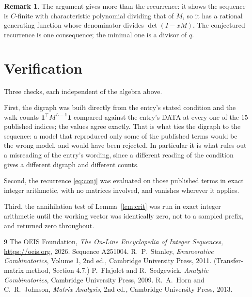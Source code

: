 \documentclass[11pt,a4paper]{article}
\theoremstyle{plain}
\theoremstyle{definition}
\newtheorem{remark}[theorem]{Remark}
\begin{document}
\begin{remark}
The argument gives more than the recurrence: it shows the sequence is $C$-finite with
characteristic polynomial dividing that of $M$, so it has a rational generating function
whose denominator divides $\det(I-xM)$. The conjectured recurrence is one consequence; the
minimal one is a divisor of $q$.
\end{remark}

\section{Verification}

Three checks, each independent of the algebra above.

First, the digraph was built directly from the entry's stated condition and the walk counts
$\mathbf{1}^{\!\top}M^{L-1}\mathbf{1}$ compared against the entry's DATA at
every one of the $15$ published indices; the values agree exactly. That is what ties
the digraph to the sequence: a model that reproduced only some of the published terms would
be the wrong model, and would have been rejected. In particular it is what rules out a
misreading of the entry's wording, since a different reading of the condition gives a
different digraph and different counts.

Second, the recurrence \eqref{eq:conj} was evaluated on those published terms in exact
integer arithmetic, with no matrices involved, and vanishes wherever it applies.

Third, the annihilation test of Lemma~\ref{lem:crit} was run in exact integer arithmetic
until the working vector was identically zero, not to a sampled prefix, and returned zero
throughout.

\begin{thebibliography}{9}
 The OEIS Foundation, \emph{The On-Line Encyclopedia of Integer
Sequences}, \url{https://oeis.org}, 2026. Sequence A251004.
 R.~P.~Stanley, \emph{Enumerative Combinatorics}, Volume 1, 2nd ed.,
Cambridge University Press, 2011. (Transfer-matrix method, Section 4.7.)
 P.~Flajolet and R.~Sedgewick, \emph{Analytic Combinatorics}, Cambridge
University Press, 2009.
 R.~A.~Horn and C.~R.~Johnson, \emph{Matrix Analysis}, 2nd ed., Cambridge
University Press, 2013.
\end{thebibliography}
\end{document}
